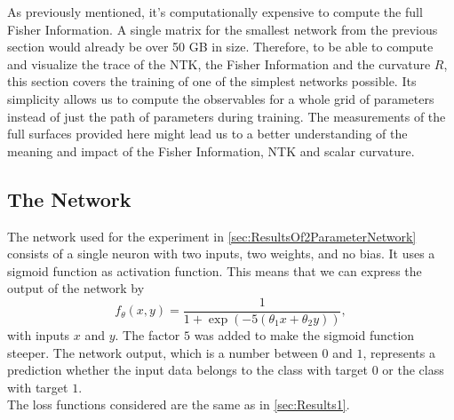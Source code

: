 As previously mentioned, it's computationally expensive to compute the full Fisher Information. A single matrix for the smallest network from the previous section would already be over 50 GB in size. Therefore, to be able to compute and visualize the trace of the NTK, the Fisher Information and the curvature $R$, this section covers the training of one of the simplest networks possible. Its simplicity allows us to compute the observables for a whole grid of parameters instead of just the path of parameters during training. The measurements of the full surfaces provided here might lead us to a better understanding of the meaning and impact of the Fisher Information, NTK and scalar curvature.

\subsection{The Network}
The network used for the experiment in \cref{sec:ResultsOf2ParameterNetwork} consists of a single neuron with two inputs, two weights, and no bias. It uses a sigmoid function \cite{ActivationFunctionOverview} as activation function. This means that we can express the output of the network by 
\begin{equation}\label{eq:Results2Sigmoid}
	f_\theta(x,y) = \frac{1}{1+ \exp (-5(\theta_1 x + \theta_2 y))},
\end{equation}
with inputs $x$ and $y$. The factor $5$ was added to make the sigmoid function steeper. The network output, which is a number between $0$ and $1$, represents a prediction whether the input data belongs to the class with target $0$ or the class with target $1$.\\
The loss functions considered are the same as in \cref{sec:Results1}.

